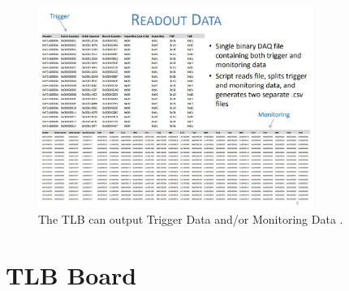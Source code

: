 \begin{figure}[htbp!] 
\centering    
\includegraphics[width=0.8\textwidth]{ChapterDAQ/Figs/GeneralDAQ/ReadoutData.jpg}
\caption[TLB Trigger and Monitoring Data output]{The TLB can output Trigger Data and/or  Monitoring Data \cite{debieux_faser_2019}.}
\label{fig:ReadoutData}
\end{figure}


\section{TLB Board}


